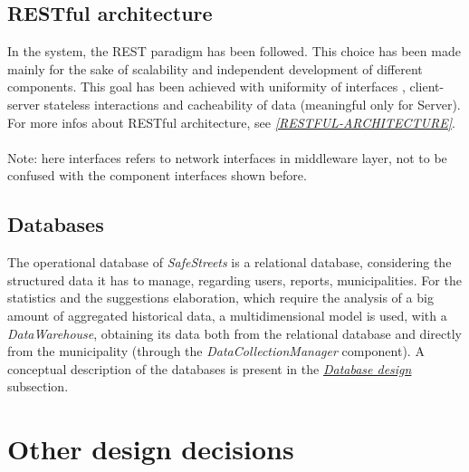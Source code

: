 \documentclass[a4paper]{report}
\begin{document}
\subsection{RESTful architecture}
In the system, the REST paradigm has been followed. This choice has been made mainly for the sake of scalability and independent development of different components. This goal has been achieved with uniformity of interfaces , client-server stateless interactions and cacheability of data (meaningful only for Server). For more infos about RESTful architecture, see \hyperref[ref:RESTful-architecture]{\textit{[RESTFUL-ARCHITECTURE]}}. \label{use:RESTful-architecture} \\
\\
Note: here interfaces refers to network interfaces in middleware layer, not to be confused with the component interfaces shown before.
\subsection{Databases}
The operational database of \textit{SafeStreets} is a relational database, considering the structured data it has to manage, regarding users, reports, municipalities. For the statistics and the suggestions elaboration, which require the analysis of a big amount of aggregated historical data, a multidimensional model is used, with a \textit{DataWarehouse}, obtaining its data both from the relational database and directly from the municipality (through the \textit{DataCollectionManager} component). A conceptual description of the databases is present in the \hyperref[sec:db-design]{\textit{Database design}} subsection.
 

\section{Other design decisions}
\end{document}
